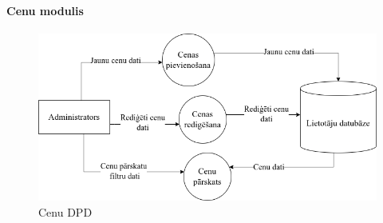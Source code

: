 \paragraph{Cenu modulis}

\begin{figure}[htbp]
	\centering
	\includegraphics[width=\linewidth]{./src/img/CenuModulis.png}
	\caption{Cenu DPD}
	\label{fig:dpd-2-price}
\end{figure}




